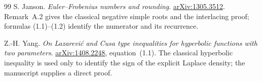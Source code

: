 \begin{thebibliography}{99}
S. Janson. \emph{Euler--Frobenius numbers and rounding}.
\href{https://arxiv.org/abs/1305.3512}{arXiv:1305.3512}.
Remark~A.2 gives the classical negative simple roots and the interlacing proof;
formulas (1.1)--(1.2) identify the numerator and its recurrence.

Z.-H. Yang. \emph{On Lazarevi\'c and Cusa type inequalities for hyperbolic
functions with two parameters}.
\href{https://arxiv.org/abs/1408.2248}{arXiv:1408.2248}, equation~(1.1).
The classical hyperbolic inequality is used only to identify the sign of
the explicit Laplace density; the manuscript supplies a direct proof.

\end{thebibliography}
